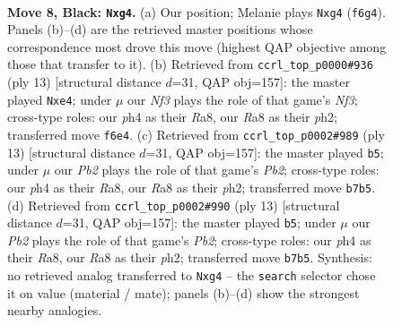 \documentclass[11pt]{article}
\begin{document}
\begin{figure}[p]\centering
\begin{subfigure}{0.46\textwidth}\centering
\resizebox{\linewidth}{!}{%
\newchessgame
\chessboard[
  setfen={rnbqkb1r/1p3ppp/4pn2/p1p5/2BP2PP/4PN2/PP3P2/RNBQ1RK1 b kq - 0 8},
  showmover=false,
  pgfstyle=straightmove, color=movearrow, markmove={f6-g4}
]}
\caption{}
\end{subfigure}\hfill
\begin{subfigure}{0.46\textwidth}\centering
\resizebox{\linewidth}{!}{%
\newchessgame
\chessboard[
  setfen={rnbqkb1r/1p3ppp/p3pn2/2p5/2BPP3/5N2/PP3PPP/RNBQ1RK1 b kq - 0 7},
  showmover=false,
  pgfstyle=straightmove, color=movearrow, markmove={f6-e4}
]}
\caption{}
\end{subfigure}
\\[4pt]
\begin{subfigure}{0.46\textwidth}\centering
\resizebox{\linewidth}{!}{%
\newchessgame
\chessboard[
  setfen={rnbqkb1r/1p3ppp/p3pn2/2p5/2BPP3/5N2/PP3PPP/RNBQ1RK1 b kq - 0 7},
  showmover=false,
  pgfstyle=straightmove, color=movearrow, markmove={b7-b5}
]}
\caption{}
\end{subfigure}\hfill
\begin{subfigure}{0.46\textwidth}\centering
\resizebox{\linewidth}{!}{%
\newchessgame
\chessboard[
  setfen={rnbqkb1r/1p3ppp/p3pn2/2p5/2BPP3/5N2/PP3PPP/RNBQ1RK1 b kq - 0 7},
  showmover=false,
  pgfstyle=straightmove, color=movearrow, markmove={b7-b5}
]}
\caption{}
\end{subfigure}
\caption{\textbf{Move 8, Black: \texttt{Nxg4}.} (a) Our position; Melanie plays \texttt{Nxg4} (\texttt{f6g4}). Panels (b)--(d) are the retrieved master positions whose correspondence most drove this move (highest QAP objective among those that transfer to it). (b) Retrieved from \texttt{ccrl\_top\_p0000\#936} (ply 13) [structural distance $d$=31, QAP obj=157]: the master played \texttt{Nxe4}; under $\mu$ our \emph{Nf3} plays the role of that game's \emph{Nf3}; cross-type roles: our \emph{p}h4 as their \emph{R}a8, our \emph{R}a8 as their \emph{p}h2; transferred move \texttt{f6e4}. (c) Retrieved from \texttt{ccrl\_top\_p0002\#989} (ply 13) [structural distance $d$=31, QAP obj=157]: the master played \texttt{b5}; under $\mu$ our \emph{Pb2} plays the role of that game's \emph{Pb2}; cross-type roles: our \emph{p}h4 as their \emph{R}a8, our \emph{R}a8 as their \emph{p}h2; transferred move \texttt{b7b5}. (d) Retrieved from \texttt{ccrl\_top\_p0002\#990} (ply 13) [structural distance $d$=31, QAP obj=157]: the master played \texttt{b5}; under $\mu$ our \emph{Pb2} plays the role of that game's \emph{Pb2}; cross-type roles: our \emph{p}h4 as their \emph{R}a8, our \emph{R}a8 as their \emph{p}h2; transferred move \texttt{b7b5}. Synthesis: no retrieved analog transferred to \texttt{Nxg4} -- the \texttt{search} selector chose it on value (material / mate); panels (b)--(d) show the strongest nearby analogies.}
\label{fig:thought-m15}
\end{figure}
\end{document}
